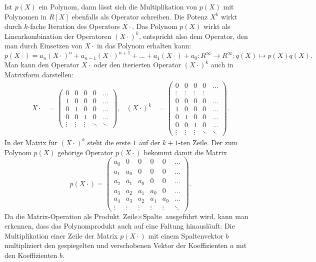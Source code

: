 Ist $p(X)$ ein Polynom, dann lässt sich die Multiplikation
von $p(X)$ mit Polynomen in $R[X]$ ebenfalls als Operator schreiben.
Die Potenz $X^k$ wirkt durch $k$-fache Iteration des Operators
$X\cdot$.
Das Polynom $p(X)$ wirkt als Linearkombination der Operatoren $(X\cdot)^k$,
entspricht also dem Operator, den man durch Einsetzen von $X\cdot$
in das Polynom erhalten kann:
\[
p(X\cdot)
=
a_n(X\cdot)^n + a_{n-1}(X\cdot)^{n+1} + \dots + a_1(X\cdot) + a_0
:
R^\infty \to R^\infty
:
q(X) 
\mapsto
p(X)q(X).
\]
Man kann den Operator $X\cdot$ oder den iterierten Operator
$(X\cdot)^k$ auch in Matrixform darstellen:
\begin{align*}
{X\cdot}
&=
\begin{pmatrix}
0&0&0&0&\dots\\
1&0&0&0&\dots\\
0&1&0&0&\dots\\
0&0&1&0&\dots\\
\vdots&\vdots&\vdots&\ddots&\ddots
\end{pmatrix},
&
(X\cdot)^k
&=
\begin{pmatrix}
  0   &  0   &  0   &  0   &\dots\\
\vdots&\vdots&\vdots&\vdots&     \\
  0   &  0   &  0   &  0   &\dots\\
  1   &  0   &  0   &  0   &\dots\\
  0   &  1   &  0   &  0   &\dots\\
  0   &  0   &  1   &  0   &\dots\\
\vdots&\vdots&\vdots&\ddots&\ddots
\end{pmatrix}.
\end{align*}
In der Matrix für $(X\cdot)^k$ steht die erste $1$ auf der
$k+1$-ten Zeile.
Der zum Polynom $p(X)$ gehörige Operator $p(X\cdot)$ bekommt
damit die Matrix
\[
p(X\cdot)
=
\begin{pmatrix}
a_0    & 0     &  0   &  0   &  0   & \dots  \\
a_1    &a_0    &  0   &  0   &  0   & \dots  \\
a_2    &a_1    & a_0  &  0   &  0   & \dots  \\
a_3    &a_2    & a_1  & a_0  &  0   & \dots  \\
a_4    &a_3    & a_2  & a_1  & a_0  & \dots  \\
\vdots &\vdots &\vdots&\vdots&\vdots&\ddots
\end{pmatrix}.
\]
Da die Matrix-Operation als Produkt
$\text{Zeile}\times\text{Spalte}$ ausgeführt wird,
kann man erkennen, dass das Polynomprodukt auch auf
eine Faltung hinausläuft:
Die Multiplikation einer Zeile der Matrix $p(X\cdot)$  mit
einem Spaltenvektor $b$ multipliziert den gespiegelten und verschobenen
Vektor der Koeffizienten $a$ mit den Koeffizienten $b$.

